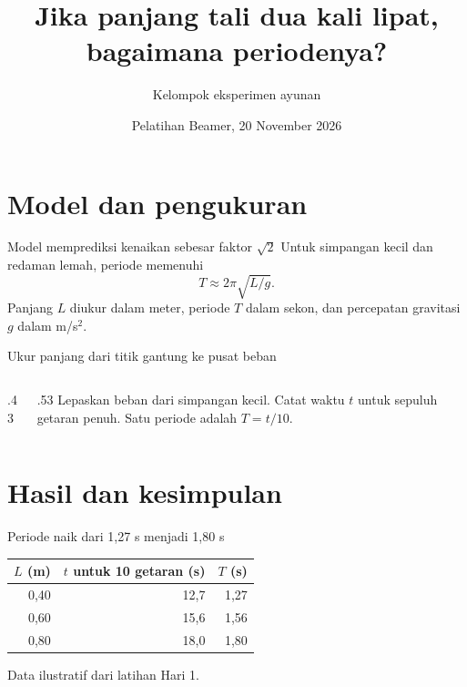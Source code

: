 \documentclass[aspectratio=169,11pt]{beamer}
\title{Jika panjang tali dua kali lipat, bagaimana periodenya?}
\author{Kelompok eksperimen ayunan}
\date{Pelatihan Beamer, 20 November 2026}
\begin{document}
\begin{frame}[plain]
  \titlepage
\end{frame}

\section{Model dan pengukuran}
\begin{frame}{Model memprediksi kenaikan sebesar faktor $\sqrt{2}$}
  Untuk simpangan kecil dan redaman lemah, periode memenuhi
  \[
    T \approx 2\pi\sqrt{L/g}.
  \]
  Panjang $L$ diukur dalam meter, periode $T$ dalam sekon,
  dan percepatan gravitasi $g$ dalam m/s$^2$.
\end{frame}

\begin{frame}{Ukur panjang dari titik gantung ke pusat beban}
  \begin{columns}[c,onlytextwidth]
    \begin{column}{.43\textwidth}
      \centering
    \end{column}
    \begin{column}{.53\textwidth}
      Lepaskan beban dari simpangan kecil. Catat waktu $t$ untuk sepuluh
      getaran penuh. Satu periode adalah $T=t/10$.
    \end{column}
  \end{columns}
\end{frame}

\section{Hasil dan kesimpulan}
\begin{frame}{Periode naik dari 1,27 s menjadi 1,80 s}
  \centering
  \begin{tabular}{rrr}
    \toprule
    $L$ (m) & $t$ untuk 10 getaran (s) & $T$ (s)\\
    \midrule
    0,40 & 12,7 & 1,27\\
    0,60 & 15,6 & 1,56\\
    0,80 & 18,0 & 1,80\\
    \bottomrule
  \end{tabular}
  \par\bigskip Data ilustratif dari latihan Hari 1.
\end{frame}
\end{document}
